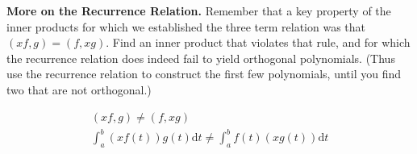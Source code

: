 \textbf{More on the Recurrence Relation.} Remember that a key property
of the inner products for which we established the three term relation
was that $(xf,g) = (f,xg)$. Find an inner product that violates that
rule, and for which the recurrence relation does indeed fail to yield
orthogonal polynomials. (Thus use the recurrence relation to construct
the first few polynomials, until you find two that are not orthogonal.)

{\color{blue}
\[
\begin{aligned}
(xf, g) \ne (f, xg) \\
\int_a^b (x f(t)) g(t) \textrm{d}t \ne \int_a^b f(t) (x g(t)) \textrm{d}t
\end{aligned}
\]
}
